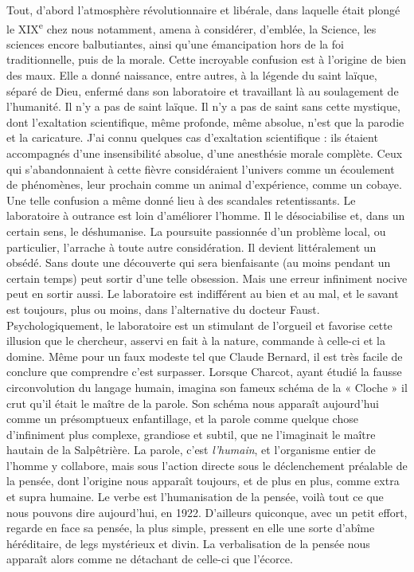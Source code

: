\documentclass[french,twoside]{book} %
\begin{document}
Tout, d’abord l’atmosphère révolutionnaire et libérale, dans laquelle était plongé le XIX\textsuperscript{e} chez nous notamment, amena à considérer, d’emblée, la Science, les sciences encore balbutiantes, ainsi qu’une émancipation hors de la foi traditionnelle, puis de la morale. Cette incroyable confusion est à l’origine de bien des maux. Elle a donné naissance, entre autres, à la légende du saint laïque, séparé de Dieu, enfermé dans son laboratoire et travaillant là au soulagement de l’humanité. Il n’y a pas de saint laïque. Il n’y a pas de saint sans cette mystique, dont l’exaltation scientifique, même profonde, même absolue, n’est que la parodie et la caricature. J’ai connu quelques cas d’exaltation scientifique : ils étaient accompagnés d’une insensibilité absolue, d’une anesthésie morale complète. Ceux qui s’abandonnaient à cette fièvre considéraient l’univers comme un écoulement de phénomènes, leur prochain comme un animal d’expérience, comme un cobaye. Une telle confusion a même donné lieu à des scandales retentissants. Le laboratoire à outrance est loin d’améliorer l’homme. Il le désociabilise et, dans un certain sens, le déshumanise. La poursuite passionnée d’un problème local, ou particulier, l’arrache à toute autre considération. Il devient littéralement un obsédé. Sans doute une découverte qui sera bienfaisante (au moins pendant un certain temps) peut sortir d’une telle obsession. Mais une erreur infiniment nocive peut en sortir aussi. Le laboratoire est indifférent au bien et au mal, et le savant est toujours, plus ou moins, dans l’alternative du docteur Faust. Psychologiquement, le laboratoire est un stimulant de l’orgueil et favorise cette illusion que le chercheur, asservi en fait à la nature, commande à celle-ci et la domine. Même pour un faux modeste tel que Claude Bernard, il est très facile de conclure que comprendre c’est surpasser. Lorsque Charcot, ayant étudié la fausse circonvolution du langage humain, imagina son fameux schéma de la « Cloche » il crut qu’il était le maître de la parole. Son schéma nous apparaît aujourd’hui comme un présomptueux enfantillage, et la parole comme quelque chose d’infiniment plus complexe, grandiose et subtil, que ne l’imaginait le maître hautain de la Salpêtrière. La parole, c’est {\itshape l’humain}, et l’organisme entier de l’homme y collabore, mais sous l’action directe sous le déclenchement préalable de la pensée, dont l’origine nous apparaît toujours, et de plus en plus, comme extra et supra humaine. Le verbe est l’humanisation de la pensée, voilà tout ce que nous pouvons dire aujourd’hui, en 1922. D’ailleurs quiconque, avec un petit effort, regarde en face sa pensée, la plus simple, pressent en elle une sorte d’abîme héréditaire, de legs mystérieux et divin. La verbalisation de la pensée nous apparaît alors comme ne détachant de celle-ci que l’écorce.\par
\end{document}
